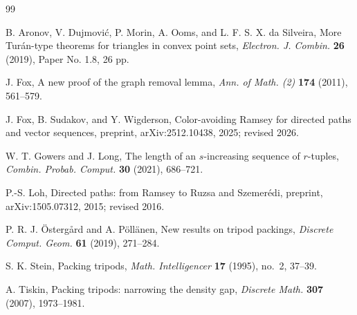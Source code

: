 \documentclass[11pt]{article}
\numberwithin{equation}{section}
\theoremstyle{definition}
\theoremstyle{remark}
\begin{document}
\begin{thebibliography}{99}

B. Aronov, V. Dujmovi\'c, P. Morin, A. Ooms, and L. F. S. X. da Silveira,
More Turán-type theorems for triangles in convex point sets,
\emph{Electron. J. Combin.} \textbf{26} (2019), Paper No. 1.8, 26 pp.

J. Fox,
A new proof of the graph removal lemma,
\emph{Ann. of Math. (2)} \textbf{174} (2011), 561--579.

J. Fox, B. Sudakov, and Y. Wigderson,
Color-avoiding Ramsey for directed paths and vector sequences,
preprint, arXiv:2512.10438, 2025; revised 2026.

W. T. Gowers and J. Long,
The length of an $s$-increasing sequence of $r$-tuples,
\emph{Combin. Probab. Comput.} \textbf{30} (2021), 686--721.

P.-S. Loh,
Directed paths: from Ramsey to Ruzsa and Szemerédi,
preprint, arXiv:1505.07312, 2015; revised 2016.

P. R. J. Östergård and A. Pöllänen,
New results on tripod packings,
\emph{Discrete Comput. Geom.} \textbf{61} (2019), 271--284.

S. K. Stein,
Packing tripods,
\emph{Math. Intelligencer} \textbf{17} (1995), no.~2, 37--39.

A. Tiskin,
Packing tripods: narrowing the density gap,
\emph{Discrete Math.} \textbf{307} (2007), 1973--1981.

\end{thebibliography}
\end{document}
